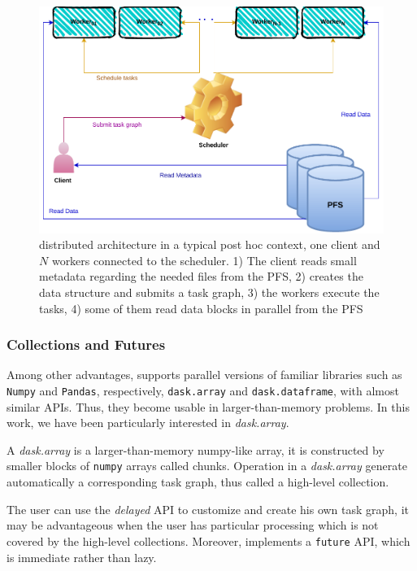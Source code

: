 \begin{figure}[tb]\centering
\includegraphics[scale=0.6]{figures/DaskArchiecture.pdf}
\caption{\dask distributed architecture in a typical post hoc context, one client and $N$ workers connected to the scheduler. 1) The client reads small metadata regarding the needed files from the PFS, 2) creates the \dask data structure and submits a task graph, 3) the workers execute the tasks, 4) some of them read data blocks in parallel from the PFS}
\label{figdaskarchi}
\end{figure}

\subsubsection{\dask Collections and Futures}
Among other advantages, \dask supports parallel versions of familiar libraries such as \texttt{Numpy} and \texttt{Pandas}, respectively, \texttt{dask.array} and \texttt{dask.dataframe}, with almost similar APIs. 
Thus, they become usable in larger-than-memory problems. In this work, we have been particularly interested in \textit{dask.array}. 

A \textit{dask.array}\cite{rocklin_dask_2015} is a larger-than-memory numpy-like array, it is constructed by smaller blocks of \texttt{numpy} arrays called chunks. Operation in a \textit{dask.array} generate automatically a corresponding task graph, thus called a high-level collection. 

The user can use the \textit{delayed} API to customize and create his own task graph, it may be advantageous when the user has particular processing which is not covered by the high-level collections. 
Moreover, \dask implements a \texttt{future} API, which is immediate rather than lazy.



